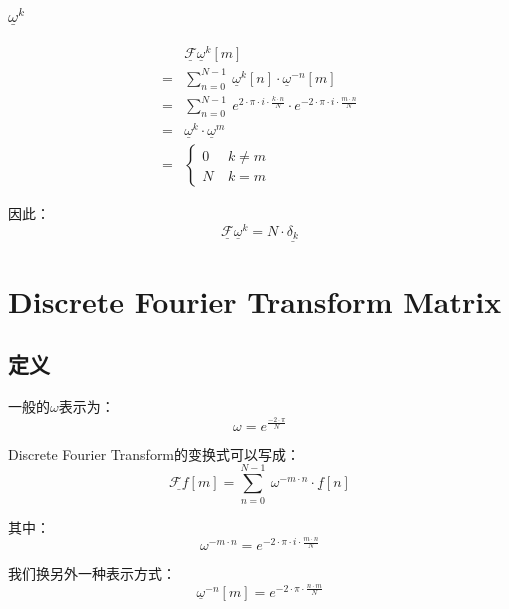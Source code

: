 \subsubsection{$\underline{\omega}^k$}
\begin{align*}
	  & \underline{\mathcal{F}}\underline{\omega}^k[m]                                                                             \\
	= & \sum\limits_{n=0}^{N-1}\ \underline{\omega}^k[n]\cdot \underline{\omega}^{-n}[m]                                           \\
	= & \sum\limits_{n=0}^{N-1}\ e^{2\cdot \pi\cdot i\cdot \frac{k\cdot n}{N}}\cdot e^{-2\cdot \pi\cdot i\cdot \frac{m\cdot n}{N}} \\
	= & \underline{\omega}^k\cdot \underline{\omega}^m                                                                             \\
	= & \begin{cases}
		0 & \ k\neq m \\
		N & \ k=m
	\end{cases}
\end{align*}

因此：
\begin{equation}
	\underline{\mathcal{F}}\underline{\omega}^k=N\cdot \underline{\delta_k}
\end{equation}

\section{Discrete Fourier Transform Matrix}
\subsection{定义}
一般的$\omega$表示为：
$$
	\omega=e^{\frac{-2\cdot\pi}{N}}
$$

Discrete Fourier Transform的变换式可以写成：
$$
	\underline{\mathcal{F}f}[m]=\sum\limits_{n=0}^{N-1}\ \omega^{-m\cdot n}\cdot \underline{f}[n]
$$

其中：
$$
	\omega^{-m\cdot n}=e^{-2\cdot \pi\cdot i\cdot \frac{m\cdot n}{N}}
$$

我们换另外一种表示方式：
$$
	\underline{\omega}^{-n}[m]=e^{-2\cdot\pi\cdot\frac{ n\cdot m}{N}}
$$

